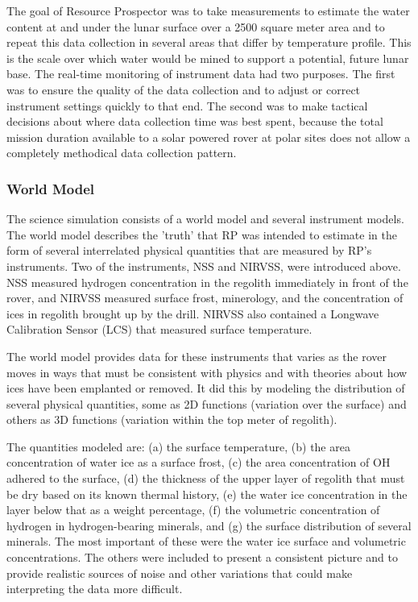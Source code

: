 \documentclass[twocolumn,letterpaper]{IEEEAerospaceCLS}  %
\begin{document}
The goal of Resource Prospector was to take measurements to estimate the water content at and under the lunar surface over a 2500 square meter area and to repeat this data collection in several areas that differ by temperature profile.  This is the scale over which water would be mined to support a potential, future lunar base.  The real-time monitoring of instrument data had two purposes.  The first was to ensure the quality of the data collection and to adjust or correct instrument settings quickly to that end.  The second was to make tactical decisions about where data collection time was best spent, because the total mission duration available to a solar powered rover at polar sites does not allow a completely methodical data collection pattern.

\subsubsection{World Model}
The science simulation consists of a world model and several instrument models.  The world model describes the 'truth' that RP was intended to estimate in the form of several interrelated physical quantities that are measured by RP's instruments.  Two of the instruments, NSS and NIRVSS, were introduced above.  NSS measured hydrogen concentration in the regolith immediately in front of the rover, and NIRVSS measured surface frost, minerology, and the concentration of ices in regolith brought up by the drill.  NIRVSS also contained a Longwave Calibration Sensor (LCS) that measured surface temperature.

The world model provides data for these instruments that varies as the rover moves in ways that must be consistent with physics and with theories about how ices have been emplanted or removed.  It did this by modeling the distribution of several physical quantities, some as 2D functions (variation over the surface) and others as 3D functions (variation within the top meter of regolith).

The quantities modeled are: (a) the surface temperature, (b) the area concentration of water ice as a surface frost, (c) the area concentration of OH adhered to the surface, (d) the thickness of the upper layer of regolith that must be dry based on its known thermal history, (e) the water ice concentration in the layer below that as a weight percentage, (f) the volumetric concentration of hydrogen in hydrogen-bearing minerals, and (g) the surface distribution of several minerals.  The most important of these were the water ice surface and volumetric concentrations.  The others were included to present a consistent picture and to provide realistic sources of noise and other variations that could make interpreting the data more difficult.
\end{document}
